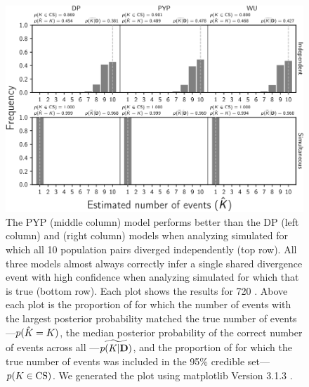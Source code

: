 \begin{figure}[htbp]
    \begin{center}
        \includegraphics[width=\textwidth,height=\textheight,keepaspectratio]{../images/from-project-repo/infer-columns-by-fixed-rows-nevents-cropped.pdf}
        \captionsetup{name=Figure S, labelformat=noSpace, listformat=sFigList}
        \caption{
        The PYP (middle column) model performs better than the DP (left column)
        and \wunif (right column) models when analyzing simulated \datasets for
        which all 10 population pairs diverged independently (top row).
        All three models almost always correctly infer a single shared
        divergence event with high confidence when analyzing simulated
        \datasets for which that is true (bottom row).
        Each plot shows the results for 720 \datasets.
        Above each plot is
        the proportion of \datasets for which the number of events with the largest
        posterior probability matched the true number of events---$p(\hat{K_{}}
        = K_{})$,
        the median posterior probability of the correct number of events across all
        \datasets---$\widetilde{p(K_{}|\mathbf{D})}$, and
        the proportion of \datasets for which the true number of events was
        included in the 95\% credible set---$p(K_{} \in
        \textrm{CS})$.
        We generated the plot using matplotlib Version 3.1.3
        \citep{matplotlib}.
        }
        \label{fig:neventsfixedcomparison}
    \end{center}
\end{figure}

